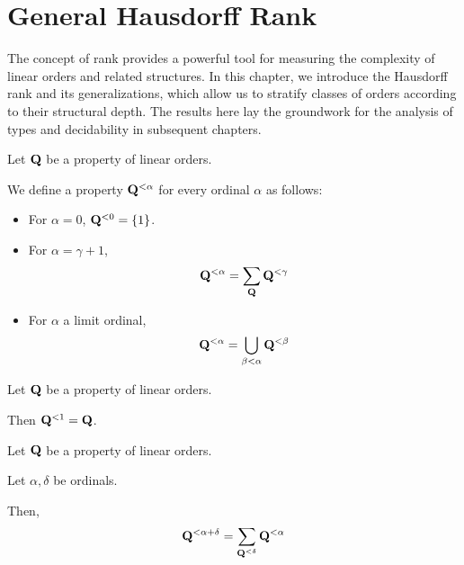 \section{General Hausdorff Rank}

The concept of rank provides a powerful tool for measuring the complexity of linear orders and related structures. In this chapter, we introduce the Hausdorff rank and its generalizations, which allow us to stratify classes of orders according to their structural depth. The results here lay the groundwork for the analysis of types and decidability in subsequent chapters.

\begin{definition}
  Let $\mathbf{Q}$ be a property of linear orders.

  We define a property $\mathbf{Q}^{< \alpha}$
  for every ordinal $\alpha$ as follows:

  \begin{itemize}
    \item For $\alpha = 0$, $\mathbf{Q}^{< 0} = \left\{ {1} \right\}$.
    \item For $\alpha = \gamma + 1$,
          \[\mathbf{Q}^{< \alpha} = \sum_{\mathbf{Q}}{\mathbf{Q}^{< \gamma}}\]
    \item For $\alpha$ a limit ordinal,
          \[\mathbf{Q}^{< \alpha} = \bigcup_{\beta < \alpha} \mathbf{Q}^{< \beta}\]
  \end{itemize}
\end{definition}

\begin{example}
  Let $\mathbf{Q}$ be a property of linear orders.

  Then $\mathbf{Q}^{< 1} = \mathbf{Q}$.
\end{example}

\begin{lemma}\label{sum-of-ranks}
  Let $\mathbf{Q}$ be a property of linear orders.

  Let $\alpha, \delta$ be ordinals.

  Then,
  \[
    \mathbf{Q}^{< \alpha + \delta}
    = \sum_{\mathbf{Q}^{< \delta}}{\mathbf{Q}^{< \alpha}}
  \]
\end{lemma}

